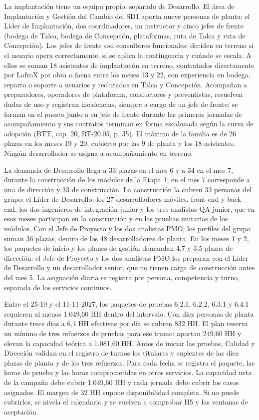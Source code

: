 La implantación tiene un equipo propio, separado de Desarrollo. El área de Implantación y Gestión del Cambio del SD1 aporta nueve personas de planta: el Líder de Implantación, dos coordinadores, un instructor y cinco jefes de frente (bodega de Talca, bodega de Concepción, plataformas, ruta de Talca y ruta de Concepción). Los jefes de frente son consultores funcionales: deciden en terreno si el usuario opera correctamente, si se aplica la contingencia y cuándo se escala. A ellos se suman 18 asistentes de implantación en terreno, contratados directamente por LafroX por obra o faena entre los meses 13 y 22, con experiencia en bodega, reparto o soporte a usuarios y reclutados en Talca y Concepción. Acompañan a preparadores, operadores de plataforma, conductores y preventistas, resuelven dudas de uso y registran incidencias, siempre a cargo de un jefe de frente; se forman en el puesto junto a su jefe de frente durante las primeras jornadas de acompañamiento y sus contratos terminan en forma escalonada según la curva de adopción (BTT, cap. 20, RT-20.05, p. 35). El máximo de la familia es de 26 plazas en los meses 19 y 20, cubierto por las 9 de planta y los 18 asistentes. Ningún desarrollador se asigna a acompañamiento en terreno.

La demanda de Desarrollo llega a 33 plazas en el mes 6 y a 34 en el mes 7, durante la construcción de los módulos de la Etapa 1; en el mes 7 corresponde a una de dirección y 33 de construcción. La construcción la cubren 33 personas del grupo: el Líder de Desarrollo, los 27 desarrolladores móviles, front-end y back-end, los dos ingenieros de integración junior y los tres analistas QA junior, que en esos meses participan en la construcción y en las pruebas unitarias de los módulos. Con el Jefe de Proyecto y los dos analistas PMO, los perfiles del grupo suman 36 plazas, dentro de los 48 desarrolladores de planta. En los meses 1 y 2, los paquetes de inicio y los planes de gestión demandan 4,7 y 3,5 plazas de dirección: el Jefe de Proyecto y los dos analistas PMO los preparan con el Líder de Desarrollo y un desarrollador senior, que no tienen carga de construcción antes del mes 5. La asignación diaria se registra por persona, competencia y turno, separada de los servicios continuos.

Entre el 25-10 y el 11-11-2027, los paquetes de pruebas 6.2.1, 6.2.2, 6.3.1 y 6.4.1 requieren al menos 1.049,60 HH dentro del intervalo. Con diez personas de planta durante trece días a 6,4 HH efectivas por día se cubren 832 HH. El plan reserva un mínimo de tres refuerzos de pruebas para ese tramo: aportan 249,60 HH y elevan la capacidad teórica a 1.081,60 HH. Antes de iniciar las pruebas, Calidad y Dirección validan en el registro de turnos los titulares y suplentes de las diez plazas de planta y de los tres refuerzos. Para cada fecha se registra el paquete, las horas de prueba y las horas comprometidas en otros servicios. La capacidad neta de la campaña debe cubrir 1.049,60 HH y cada jornada debe cubrir los casos asignados. El margen de 32 HH supone disponibilidad completa. Si no puede cubrirlos, se nivela el calendario y se vuelven a comprobar H5 y las ventanas de aceptación.

